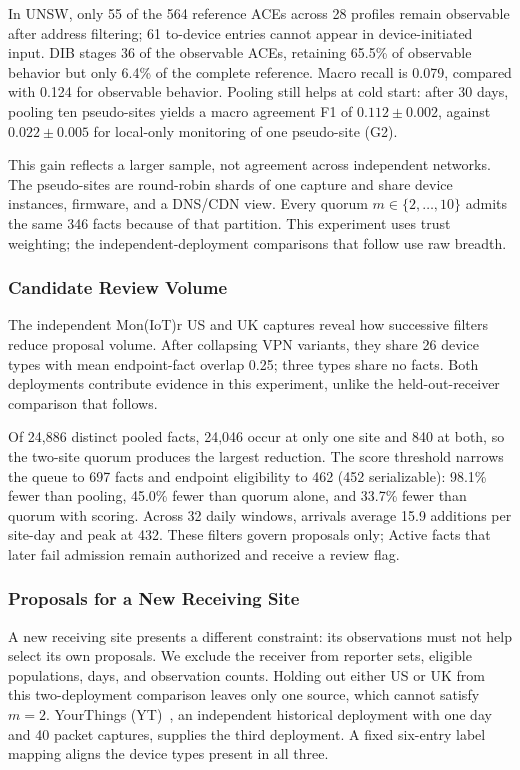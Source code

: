\documentclass[journal]{IEEEtran}
\theoremstyle{definition}
\begin{document}
In UNSW, only 55 of the 564 reference ACEs across 28 profiles remain observable after address filtering; 61 to-device entries cannot appear in device-initiated input. DIB stages 36 of the observable ACEs, retaining 65.5\% of observable behavior but only 6.4\% of the complete reference. Macro recall is 0.079, compared with 0.124 for observable behavior. Pooling still helps at cold start: after 30 days, pooling ten pseudo-sites yields a macro agreement F1 of $0.112\pm0.002$, against $0.022\pm0.005$ for local-only monitoring of one pseudo-site (G2).

This gain reflects a larger sample, not agreement across independent networks. The pseudo-sites are round-robin shards of one capture and share device instances, firmware, and a DNS/CDN view. Every quorum $m\in\{2,\ldots,10\}$ admits the same 346 facts because of that partition. This experiment uses trust weighting; the independent-deployment comparisons that follow use raw breadth.

\subsubsection{Candidate Review Volume}
\label{sec:workload-results}
The independent Mon(IoT)r US and UK captures reveal how successive filters reduce proposal volume. After collapsing VPN variants, they share 26 device types with mean endpoint-fact overlap 0.25; three types share no facts. Both deployments contribute evidence in this experiment, unlike the held-out-receiver comparison that follows.

Of 24,886 distinct pooled facts, 24,046 occur at only one site and 840 at both, so the two-site quorum produces the largest reduction. The score threshold narrows the queue to 697 facts and endpoint eligibility to 462 (452 serializable): 98.1\% fewer than pooling, 45.0\% fewer than quorum alone, and 33.7\% fewer than quorum with scoring. Across 32 daily windows, arrivals average 15.9 additions per site-day and peak at 432. These filters govern proposals only; Active facts that later fail admission remain authorized and receive a review flag.

\subsubsection{Proposals for a New Receiving Site}
\label{sec:loo-results}

A new receiving site presents a different constraint: its observations must not help select its own proposals. We exclude the receiver from reporter sets, eligible populations, days, and observation counts. Holding out either US or UK from this two-deployment comparison leaves only one source, which cannot satisfy $m=2$. YourThings (YT)~\cite{alrawi2019yourthings}, an independent historical deployment with one day and 40 packet captures, supplies the third deployment. A fixed six-entry label mapping aligns the device types present in all three.
\end{document}
